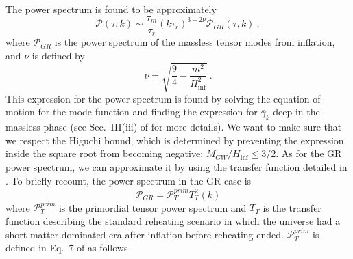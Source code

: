\documentclass[prd,twocolumn,aps,psfig,nofootinbib,nobibnotes,superscriptaddress,preprintnumbers,times]{revtex4-2}
\begin{document}
The power spectrum is found to be approximately
\begin{equation}\label{eqn:20}
    \mathcal{P}(\tau, k) \sim \frac{\tau_m}{\tau_r}(k\tau_r)^{3-2\nu}\mathcal{P}_{GR}(\tau,k)\ , 
\end{equation}
where $\mathcal{P}_{GR}$ is the power spectrum of the massless tensor modes from inflation, and $\nu$ is defined by 
\begin{equation}\label{eqn:21}
    \nu = \sqrt{\frac{9}{4} - \frac{m^2}{H_{\inf}^2}}\ .
\end{equation}
This expression for the power spectrum is found by solving the equation of motion for the mode function and finding the expression for $\overline{\gamma}_k$ deep in the massless phase (see Sec.\ III(iii) of \cite{Fujita:2018} for more details). We want to make sure that we respect the Higuchi bound, which is determined by preventing the expression inside the square root from becoming negative: $M_{GW}/H_{\inf} \leq 3/2$. As for the GR power spectrum, we can approximate it by using the transfer function detailed in \cite{Kuroyanagi:2015}. To briefly recount, the power spectrum in the GR case is
\begin{equation}\label{eqn:22}
    \mathcal{P}_{GR} = \mathcal{P}^{prim}_{T} T^2_T(k)
\end{equation}
where $\mathcal{P}^{prim}_{T}$ is the primordial tensor power spectrum and $T_{T}$ is the transfer function describing the standard reheating scenario in which the universe had a short matter-dominated era after inflation before reheating ended. $\mathcal{P}^{prim}_{T}$ is defined 
in Eq.\ 7 of \cite{Kuroyanagi:2015} as follows
\end{document}
